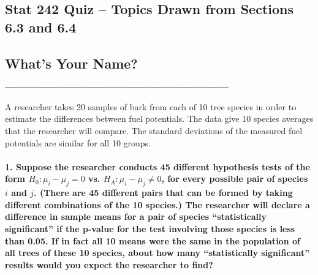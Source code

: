 \documentclass[]{article}
\title{}
\author{}
\date{}
\let\oldparagraph\paragraph
\renewcommand{\paragraph}[1]{\oldparagraph{#1}\mbox{}}
\begin{document}
\subsection{Stat 242 Quiz -- Topics Drawn from Sections 6.3 and
6.4}\label{stat-242-quiz-topics-drawn-from-sections-6.3-and-6.4}

\subsection{What's Your Name?
\_\_\_\_\_\_\_\_\_\_\_\_\_\_\_\_\_\_\_\_}\label{whats-your-name-____________________}

A researcher takes 20 samples of bark from each of 10 tree species in
order to estimate the differences between fuel potentials. The data give
10 species averages that the researcher will compare. The standard
deviations of the measured fuel potentials are similar for all 10
groups.

\paragraph{\texorpdfstring{1. Suppose the researcher conducts 45
different hypothesis tests of the form \(H_0: \mu_i - \mu_j = 0\) vs.
\(H_A: \mu_i - \mu_j \neq 0\), for every possible pair of species \(i\)
and \(j\). (There are 45 different pairs that can be formed by taking
different combinations of the 10 species.) The researcher will declare a
difference in sample means for a pair of species ``statistically
significant'' if the p-value for the test involving those species is
less than 0.05. If in fact all 10 means were the same in the population
of all trees of these 10 species, about how many ``statistically
significant'' results would you expect the researcher to
find?}{1. Suppose the researcher conducts 45 different hypothesis tests of the form H\_0: \textbackslash{}mu\_i - \textbackslash{}mu\_j = 0 vs. H\_A: \textbackslash{}mu\_i - \textbackslash{}mu\_j \textbackslash{}neq 0, for every possible pair of species i and j. (There are 45 different pairs that can be formed by taking different combinations of the 10 species.) The researcher will declare a difference in sample means for a pair of species statistically significant if the p-value for the test involving those species is less than 0.05. If in fact all 10 means were the same in the population of all trees of these 10 species, about how many statistically significant results would you expect the researcher to find?}}\label{suppose-the-researcher-conducts-45-different-hypothesis-tests-of-the-form-h_0-mu_i---mu_j-0-vs.-h_a-mu_i---mu_j-neq-0-for-every-possible-pair-of-species-i-and-j.-there-are-45-different-pairs-that-can-be-formed-by-taking-different-combinations-of-the-10-species.-the-researcher-will-declare-a-difference-in-sample-means-for-a-pair-of-species-statistically-significant-if-the-p-value-for-the-test-involving-those-species-is-less-than-0.05.-if-in-fact-all-10-means-were-the-same-in-the-population-of-all-trees-of-these-10-species-about-how-many-statistically-significant-results-would-you-expect-the-researcher-to-find}
\end{document}
